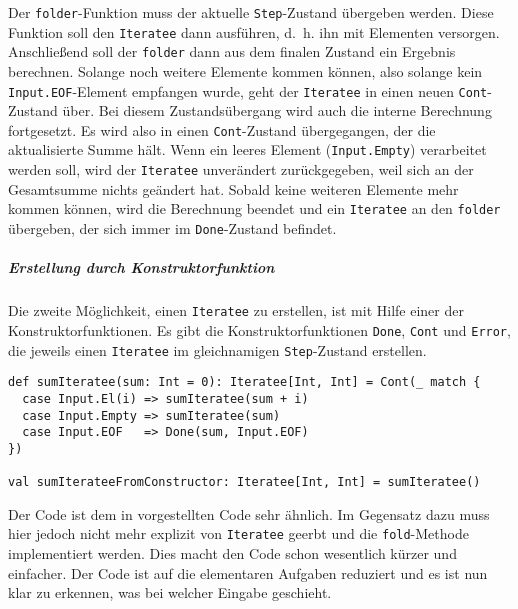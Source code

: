 \documentclass[draft=false
              ,paper=a4
              ,twoside=false
              ,fontsize=11pt
              ,headsepline
              ,BCOR10mm
              ,DIV11
              ]{scrbook}
\begin{document}
Der \lstinline|folder|-Funktion muss der aktuelle \lstinline|Step|-Zustand übergeben werden.
Diese Funktion soll den \lstinline|Iteratee| dann ausführen, d.~h. ihn mit Elementen versorgen.
Anschließend soll der \lstinline|folder| dann aus dem finalen Zustand ein Ergebnis berechnen.
Solange noch weitere Elemente kommen können, also solange kein \lstinline|Input.EOF|-Element empfangen wurde, geht der \lstinline|Iteratee| in einen neuen \lstinline|Cont|-Zustand über.
Bei diesem Zustandsübergang wird auch die interne Berechnung fortgesetzt.
Es wird also in einen \lstinline|Cont|-Zustand übergegangen, der die aktualisierte Summe hält.
Wenn ein leeres Element (\lstinline|Input.Empty|) verarbeitet werden soll, wird der \lstinline|Iteratee| unverändert zurückgegeben, weil sich an der Gesamtsumme nichts geändert hat.
Sobald keine weiteren Elemente mehr kommen können, wird die Berechnung beendet und ein \lstinline|Iteratee| an den \lstinline|folder| übergeben, der sich immer im \lstinline|Done|-Zustand befindet.


\subparagraph{Erstellung durch Konstruktorfunktion} %
\label{subp:erstellung_durch_konstruktorfunktion}\mbox{} %

Die zweite Möglichkeit, einen \lstinline|Iteratee| zu erstellen, ist mit Hilfe einer der Konstruktorfunktionen.
Es gibt die Konstruktorfunktionen \lstinline|Done|, \lstinline|Cont| und \lstinline|Error|, die jeweils einen \lstinline|Iteratee| im gleichnamigen \lstinline|Step|-Zustand erstellen.

\begin{lstlisting}
def sumIteratee(sum: Int = 0): Iteratee[Int, Int] = Cont(_ match {
  case Input.El(i) => sumIteratee(sum + i)
  case Input.Empty => sumIteratee(sum)
  case Input.EOF   => Done(sum, Input.EOF)
})

val sumIterateeFromConstructor: Iteratee[Int, Int] = sumIteratee()
\end{lstlisting}

Der Code ist dem in  vorgestellten Code sehr ähnlich.
Im Gegensatz dazu muss hier jedoch nicht mehr explizit von \lstinline|Iteratee| geerbt und die \lstinline|fold|-Methode implementiert werden.
Dies macht den Code schon wesentlich kürzer und einfacher.
Der Code ist auf die elementaren Aufgaben reduziert und es ist nun klar zu erkennen, was bei welcher Eingabe geschieht.

\end{document}
